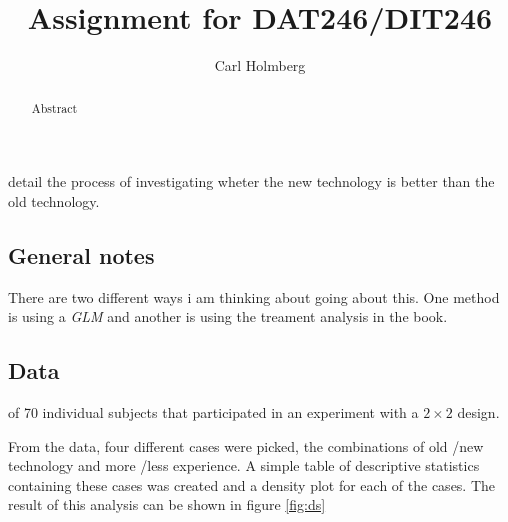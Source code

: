 \documentclass{tufte-handout}
\title{Assignment for DAT246\slash DIT246}
\author[Carl Holmberg]{Carl Holmberg}
\begin{document}
\maketitle

\begin{abstract}
    \noindent Abstract
\end{abstract}


 detail the process of investigating wheter the new technology is better than the old technology.

\subsection*{General notes}
There are two different ways i am thinking about going about this.
One method is using a \textit{GLM} and another is using the treament analysis in the book.


\subsection{Data}
 of 70 individual subjects that participated in an experiment with a $2 \times 2$ design.


From the data, four different cases were picked, the combinations of old \slash new technology and more \slash less experience.
A simple table of descriptive statistics containing these cases was created and a density plot for each of the cases.
The result of this analysis can be shown in figure \ref{fig:ds}
\end{document}
